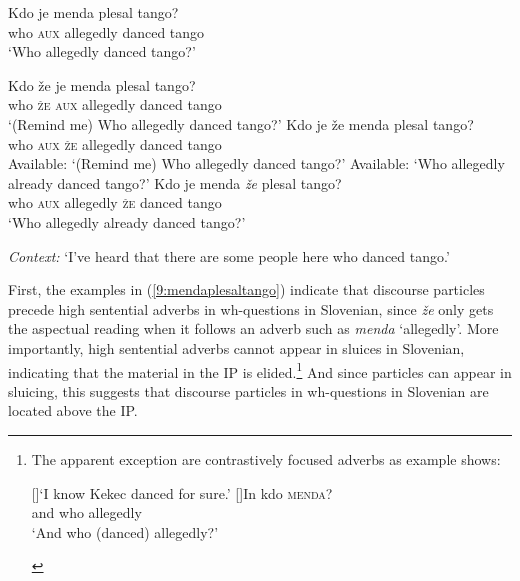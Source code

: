\documentclass[output=paper,modfonts,newtxmath,hidelinks]{langscibook}
\begin{document}
\begin{exe}
\ex \gll Kdo je menda plesal tango?\\
         who \textsc{aux} allegedly danced tango\\
 \trans `Who allegedly danced tango?'
\ex \label{9:mendaplesaltango}
\begin{xlist}
 \ex \gll	Kdo že je menda plesal tango?\\
 who \textsc{že} \textsc{aux} allegedly danced tango\\
\trans `(Remind me) Who allegedly danced tango?'
\ex \gll	Kdo je že menda plesal tango?\\
 who \textsc{aux} \textsc{že}  allegedly danced tango\\
 \glt Available: `(Remind me) Who allegedly danced tango?'
 \glt Available: `Who allegedly already danced tango?'
\ex \gll	Kdo je menda \textit{že} plesal tango?\\
 who \textsc{aux} allegedly \textsc{že} danced tango\\
\trans `Who allegedly already danced tango?'
\end{xlist}
\ex \textit{Context:} `I've heard that there are some people here who danced tango.'
\begin{xlist}
\end{xlist}
\end{exe}

\noindent First, the examples in (\ref{9:mendaplesaltango}) indicate that discourse particles precede high sentential adverbs in wh-questions in Slovenian, since \textit{že} only gets the aspectual reading when it follows an adverb such as \textit{menda} `allegedly'. More importantly, high sentential adverbs cannot appear in sluices in Slovenian, indicating that the material in the IP is elided.\footnote{The apparent exception are contrastively focused adverbs as example  shows:

\ea \label{9:fn16exi}
\begin{xlist}
[]{`I know Kekec danced for sure.'}
[]{\gll In kdo \textsc{menda}?\\
and who allegedly\\
\glt `And who (danced) allegedly?'}
\end{xlist}
\zlast} And since particles can appear in sluicing, this suggests that discourse particles in wh-questions in Slovenian are located above the IP.
\end{document}
